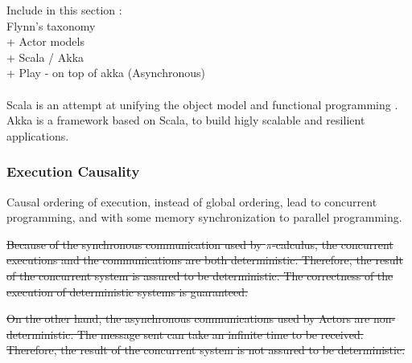 Include in this section :\\
Flynn's taxonomy \cite{Flynn1972}\\
+ Actor models\\
+ Scala / Akka\\
+ Play - on top of akka (Asynchronous)\\
\\

Scala is an attempt at unifying the object model and functional programming \cite{Odersky2004}.
Akka is a framework based on Scala, to build higly scalable and resilient applications.


\subsubsection{Execution Causality}


Causal ordering of execution, instead of global ordering, lead to concurrent programming, and with some memory synchronization to parallel programming.

\sout{
Because of the synchronous communication used by $\pi$-calculus, the concurrent executions and the communications are both deterministic.
Therefore, the result of the concurrent system is assured to be deterministic.
The correctness of the execution of deterministic systems is guaranteed.
}

\sout{
On the other hand, the asynchronous communications used by Actors are non-deterministic.
The message sent can take an infinite time to be received.
Therefore, the result of the concurrent system is not assured to be deterministic.}

